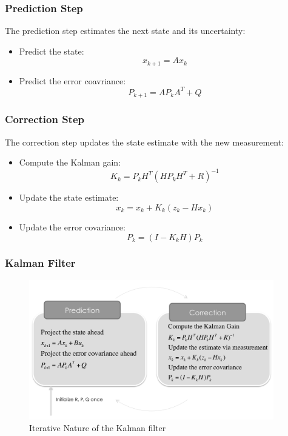\documentclass{beamer}
\begin{document}
\begin{frame}
    \frametitle{Prediction Step}

    The prediction step estimates the next state and its uncertainty:

    \begin{itemize}
        \item Predict the state:
              \begin{equation}
                  x_{k+1}=Ax_{k}
              \end{equation}

        \item Predict the error coavriance:
              \begin{equation}
                  P_{k+1}=AP_{k}A^{T}+Q
              \end{equation}
    \end{itemize}
\end{frame}

\begin{frame}
    \frametitle{Correction Step}
    The correction step updates the state estimate with the new measurement:
    \begin{itemize}
        \item Compute the Kalman gain:
              \begin{equation}
                  K_{k} = P_{k}H^{T}(HP_{k}H^{T}+R)^{-1}
              \end{equation}
        \item Update the state estimate:
              \begin{equation}
                  x_{k} = x_{k}+K_{k}(z_{k}-Hx_{k})
              \end{equation}
        \item Update the error covariance:
              \begin{equation}
                  P_{k} = (I-K_{k}H)P_{k}
              \end{equation}
    \end{itemize}
\end{frame}

\begin{frame}
    \frametitle{Kalman Filter}
    \begin{figure}
        \centering
        \includegraphics[width=0.95\textwidth]{images/06_kalman_diagram.png}
        \caption{Iterative Nature of the Kalman filter}
    \end{figure}
\end{frame}
\end{document}
